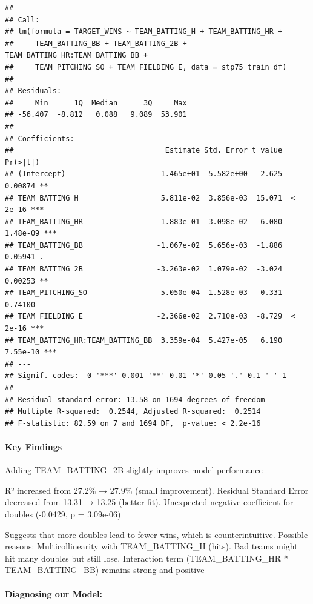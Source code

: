 \documentclass[
]{article}
\begin{document}
\begin{verbatim}
## 
## Call:
## lm(formula = TARGET_WINS ~ TEAM_BATTING_H + TEAM_BATTING_HR + 
##     TEAM_BATTING_BB + TEAM_BATTING_2B + TEAM_BATTING_HR:TEAM_BATTING_BB + 
##     TEAM_PITCHING_SO + TEAM_FIELDING_E, data = stp75_train_df)
## 
## Residuals:
##     Min      1Q  Median      3Q     Max 
## -56.407  -8.812   0.088   9.089  53.901 
## 
## Coefficients:
##                                   Estimate Std. Error t value Pr(>|t|)    
## (Intercept)                      1.465e+01  5.582e+00   2.625  0.00874 ** 
## TEAM_BATTING_H                   5.811e-02  3.856e-03  15.071  < 2e-16 ***
## TEAM_BATTING_HR                 -1.883e-01  3.098e-02  -6.080 1.48e-09 ***
## TEAM_BATTING_BB                 -1.067e-02  5.656e-03  -1.886  0.05941 .  
## TEAM_BATTING_2B                 -3.263e-02  1.079e-02  -3.024  0.00253 ** 
## TEAM_PITCHING_SO                 5.050e-04  1.528e-03   0.331  0.74100    
## TEAM_FIELDING_E                 -2.366e-02  2.710e-03  -8.729  < 2e-16 ***
## TEAM_BATTING_HR:TEAM_BATTING_BB  3.359e-04  5.427e-05   6.190 7.55e-10 ***
## ---
## Signif. codes:  0 '***' 0.001 '**' 0.01 '*' 0.05 '.' 0.1 ' ' 1
## 
## Residual standard error: 13.58 on 1694 degrees of freedom
## Multiple R-squared:  0.2544, Adjusted R-squared:  0.2514 
## F-statistic: 82.59 on 7 and 1694 DF,  p-value: < 2.2e-16
\end{verbatim}

\paragraph{Key Findings}\label{key-findings}

Adding TEAM\_BATTING\_2B slightly improves model performance

R² increased from 27.2\% → 27.9\% (small improvement). Residual Standard
Error decreased from 13.31 → 13.25 (better fit). Unexpected negative
coefficient for doubles (-0.0429, p = 3.09e-06)

Suggests that more doubles lead to fewer wins, which is
counterintuitive. Possible reasons: Multicollinearity with
TEAM\_BATTING\_H (hits). Bad teams might hit many doubles but still
lose. Interaction term (TEAM\_BATTING\_HR * TEAM\_BATTING\_BB) remains
strong and positive

\paragraph{Diagnosing our Model:}\label{diagnosing-our-model-1}
\end{document}
